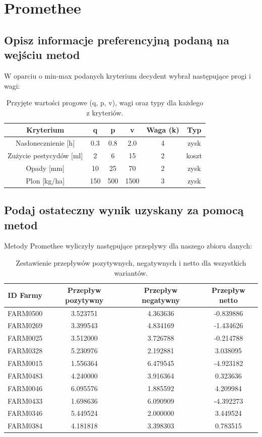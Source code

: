 \documentclass[11pt]{article}
\begin{document}
\section{Promethee} \label{sec:Promethee}
\subsection{Opisz informacje preferencyjną podaną na wejściu metod}
W oparciu o min-max podanych kryterium decydent wybrał następujące progi i wagi:
\begin{table}[H]
\centering
\begin{tabular}{|c||c|c|c|c|c|}
\hline
\textbf{Kryterium} & \textbf{q} & \textbf{p} & \textbf{v} & \textbf{Waga (k)} & \textbf{Typ} \\
\hline
Nasłonecznienie [h]            & 0.3   & 0.8   & 2.0   & 4 & zysk \\ \hline
Zużycie pestycydów [ml]        & 2     & 6     & 15    & 2 & koszt \\ \hline
Opady [mm]                     & 10    & 25    & 70    & 2 & zysk \\ \hline
Plon [kg/ha]                   & 150   & 500   & 1500  & 3 & zysk \\
\hline
\end{tabular}
\caption{Przyjęte wartości progowe (q, p, v), wagi oraz typy dla każdego z kryteriów.}
\end{table}

\subsection{Podaj ostateczny wynik uzyskany za pomocą metod}
Metody Promethee wyliczyły następujące przepływy dla naszego zbioru danych:
\begin{table}[H]
\centering
\begin{tabular}{|c||c|c|c|}
\hline
\textbf{ID Farmy} & \textbf{Przepływ pozytywny} & \textbf{Przepływ negatywny} & \textbf{Przepływ netto} \\
\hline
FARM0500 & 3.523751 & 4.363636 & -0.839886 \\ \hline
FARM0269 & 3.399543 & 4.834169 & -1.434626 \\ \hline
FARM0025 & 3.512000 & 3.726788 & -0.214788 \\ \hline
FARM0328 & 5.230976 & 2.192881 &  3.038095 \\ \hline
FARM0015 & 1.556364 & 6.479545 & -4.923182 \\ \hline
FARM0483 & 4.240000 & 3.916364 &  0.323636 \\ \hline
FARM0046 & 6.095576 & 1.885592 &  4.209984 \\ \hline
FARM0433 & 1.698636 & 6.090909 & -4.392273 \\ \hline
FARM0346 & 5.449524 & 2.000000 &  3.449524 \\ \hline
FARM0384 & 4.181818 & 3.398303 &  0.783515 \\
\hline
\end{tabular}
\caption{Zestawienie przepływów pozytywnych, negatywnych i netto dla wszystkich wariantów.}
\end{table}
\end{document}
